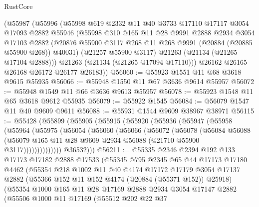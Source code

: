 \begin{lexlean}{RustCore}
\begin{coremodule}
    (@55987
      (@55996
        (@55998
          @619
          @2332
          @11
          @40
          @3733
          @17110
          @17117
          @3054
          @17093
          @2882
          @55946
          (@55998
            @310
            @165
            @11
            @28
            @9991
            @2888
            @2934
            @3054
            @17103
            @2882
            (@20876 @55900 @3117 @268 @11 @268 @9991 (@20884 (@20885 @55900 @268)) @40031)
            (@21257 @55900 @3117)
            @21263
            (@21134 (@21265 @17104 @2888)))
          @21263
          (@21134 (@21265 @17094 @17110)))
        @26162
        @26165
        @26168
        @26172
        @26177
        @26183))
@56060 := @55923 @1551 @11 @68 @3618 @9615 @55935
@56066 := @55948 @1550 @11 @67 @3636 @9614 @55957
@56072 := @55948 @1549 @11 @66 @3636 @9613 @55957
@56078 := @55923 @1548 @11 @65 @3618 @9612 @55935
@56079 := @55922 @1545
@56084 := @56079 @1547 @11 @40 @9609 @9611
@56088 := @55931 @1544 @9609 @38967 @38971
@56115 := @55428
    (@55899
      (@55905
        (@55915
          (@55920
            (@55936
              (@55947
                (@55958
                  (@55964
                    (@55975
                      (@56054
                        (@56060
                          (@56066
                            (@56072
                              (@56078
                                (@56084
                                  @56088
                                  (@56079
                                    @165
                                    @11
                                    @28
                                    @9609
                                    @2934
                                    @56088
                                    (@21710 @55900 @3117))))))))))))))
          @36532)))
@56211 := @55335
    @2346
    @2394
    @192
    @133
    @17173
    @17182
    @2888
    @17533
    (@55345
      @795
      @2345
      @65
      @44
      @17173
      @17180
      @4462
      (@55354
        @218
        @1002
        @11
        @40
        @4174
        @17172
        @17179
        @3054
        @17137
        @2882
        (@55366 @152 @11 @152 @4174 (@20884 (@55371 @152)) @25918)
        (@55354
          @1000
          @165
          @11
          @28
          @17169
          @2888
          @2934
          @3054
          @17147
          @2882
          (@55506
            @1000
            @11
            @17169
            (@55512
              @202
              @22
              @37

\end{coremodule}
\end{lexlean}

